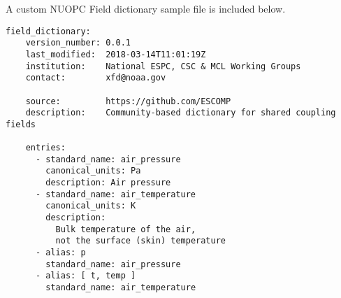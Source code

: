 A custom NUOPC Field dictionary sample file is included below.

\begin{verbatim}
field_dictionary:
    version_number: 0.0.1
    last_modified:  2018-03-14T11:01:19Z
    institution:    National ESPC, CSC & MCL Working Groups
    contact:        xfd@noaa.gov

    source:         https://github.com/ESCOMP
    description:    Community-based dictionary for shared coupling fields

    entries:
      - standard_name: air_pressure
        canonical_units: Pa
        description: Air pressure
      - standard_name: air_temperature
        canonical_units: K
        description:
          Bulk temperature of the air,
          not the surface (skin) temperature
      - alias: p
        standard_name: air_pressure
      - alias: [ t, temp ]
        standard_name: air_temperature
\end{verbatim}
